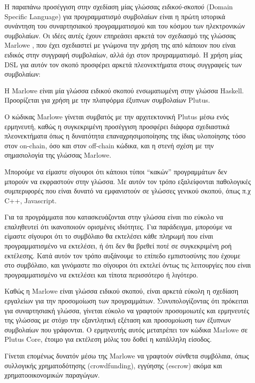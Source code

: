 Η παραπάνω προσέγγιση στην σχεδίαση μίας γλώσσας \emph{ειδικού-σκοπού}  (Domain
Specific Language) για προγραμματισμό συμβολαίων είναι η πρώτη ιστορικά
συνάντηση του συναρτησιακού προγραμματισμού και του κόσμου των ηλεκτρονικών
συμβολαίων.  Οι ιδέες αυτές έχουν επηρεάσει αρκετά τον σχεδιασμό της γλώσσας
Marlowe \cite{marlowe}, που έχει σχεδιαστεί με γνώμονα την χρήση της από
κάποιον που είναι ειδικός στην συγγραφή συμβολαίων, αλλά όχι στον
προγραμματισμό. Η χρήση μίας DSL για αυτόν τον σκοπό προσφέρει αρκετά
πλεονεκτήματα στους συγγραφείς των συμβολαίων:

Η Marlowe είναι μία γλώσσα ειδικού σκοπού ενσωματωμένη στην γλώσσα Haskell.
Προορίζεται για χρήση με την πλατφόρμα έξυπνων συμβολαίων Plutus.

Ο κώδικας Marlowe γίνεται συμβατός με την αρχιτεκτονική Plutus μέσω ενός
ερμηνευτή, καθώς η συγκεκριμένη προσέγγιση προσφέρει διάφορα σχεδιαστικά
πλεονεκτήματα όπως η δυνατότητα επαναχρησιμοποίησης της ίδιας υλοποίησης τόσο
στον on-chain, όσο και στον off-chain κώδικα, και η στενή σχέση με την
σημασιολογία της γλώσσας Marlowe.

Μπορούμε να είμαστε σίγουροι ότι κάποιοι τύποι ``κακών'' προγραμμάτων δεν
μπορούν να εκφραστούν στην γλώσσα. Με αυτόν τον τρόπο εξαλείφονται παθολογικές
συμπεριφορές που είναι δυνατό να εμφανιστούν σε γλώσσες γενικού σκοπού, όπως
π.χ C++, Javascript.

Για τα προγράμματα που κατασκευάζονται στην γλώσσα είναι πιο εύκολο να
επαληθευτεί ότι ικανοποιούν ορισμένες ιδιότητες. Για παράδειγμα, μπορούμε να
είμαστε σίγουροι ότι το συμβόλαιο θα εκτελέσει κάθε πληρωμή που είναι
προγραμματισμένο να εκτελέσει, ή ότι δεν θα βρεθεί ποτέ σε συγκεκριμένη ροή
εκτέλεσης. Κατά αυτόν τον τρόπο αυξάνουμε το επίπεδο εμπιστοσύνης που έχουμε
στο συμβόλαιο, και γινόμαστε πιο σίγουροι ότι εκτελεί όντως τις λειτουργίες που
είναι προγραμματισμένο να εκτελέσει και τίποτα περισσότερο ή λιγότερο.

Καθώς η Marlowe είναι γλώσσα ειδικού σκοπού, είναι αρκετά εύκολη η σχεδίαση
εργαλείων για την προσομοίωση των προγραμμάτων. Συνυπολογίζοντας ότι πρόκειται
για συναρτησιακή γλώσσα, γίνεται εύκολο να γραφτούν προσομοιωτές και ερμηνευτές
της γλώσσας με στόχο την εξαντλητική εξέταση και προσομοίωση των έξυπνων
συμβολαίων που γράφονται. Ο ερμηνευτής αυτός μετατρέπει τον κώδικα Marlowe σε
Plutus Core, έτοιμο για εκτέλεση μόλις του δοθεί η κατάλληλη είσοδος.

Γίνεται επομένως δυνατόν μέσω της Marlowe να γραφτούν σύνθετα συμβόλαια, όπως
συλλογικής χρηματοδότησης (crowdfunding), εγγύησης (escrow) ακόμα και
χρηματοοικονομικών παραγώγων.


